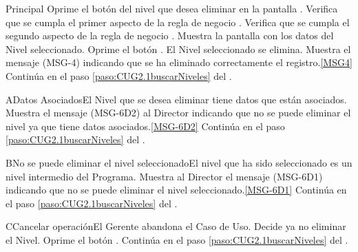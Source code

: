 	\begin{UCtrayectoria}{Principal}
			\UCpaso[\UCactor] Oprime el botón  del nivel que desea eliminar en la pantalla .
			\UCpaso Verifica que se cumpla el primer aspecto de la regla de negocio .
			\UCpaso Verifica que se cumpla el segundo aspecto de la regla de negocio . 
			\UCpaso Muestra la pantalla  con los datos del Nivel seleccionado. 
			\UCpaso [\UCactor] Oprime el botón . 
			\UCpaso El Nivel seleccionado se elimina.
			\UCpaso Muestra el mensaje (MSG-4) indicando que se ha eliminado correctamente el registro.\ref{MSG4}
			\UCpaso Continúa en el paso \ref{paso:CUG2.1buscarNiveles} del .
	\end{UCtrayectoria}

	\begin{UCtrayectoriaA}{A}{Datos Asociados}{El Nivel que se desea eliminar tiene datos que están asociados.}
			\UCpaso Muestra el mensaje (MSG-6D2) al Director indicando que no se puede eliminar el nivel ya que tiene datos asociados.\ref{MSG-6D2}
			\UCpaso Continúa en el paso \ref{paso:CUG2.1buscarNiveles} del .
		\end{UCtrayectoriaA}		


	\begin{UCtrayectoriaA}{B}{No se puede eliminar el nivel seleccionado}{El nivel que ha sido seleccionado es un nivel intermedio del Programa.}
			\UCpaso Muestra al Director el mensaje (MSG-6D1) indicando que no se puede eliminar el nivel seleccionado.\ref{MSG-6D1}
			\UCpaso Continúa en el paso \ref{paso:CUG2.1buscarNiveles} del .
		\end{UCtrayectoriaA}

		

		\begin{UCtrayectoriaA}{C}{Cancelar operación}{El Gerente abandona el Caso de Uso.}
			\UCpaso[\UCactor] Decide ya no eliminar el Nivel.
			\UCpaso[\UCactor] Oprime el botón .
			\UCpaso Continúa en el paso \ref{paso:CUG2.1buscarNiveles} del .
		\end{UCtrayectoriaA}
		
		
